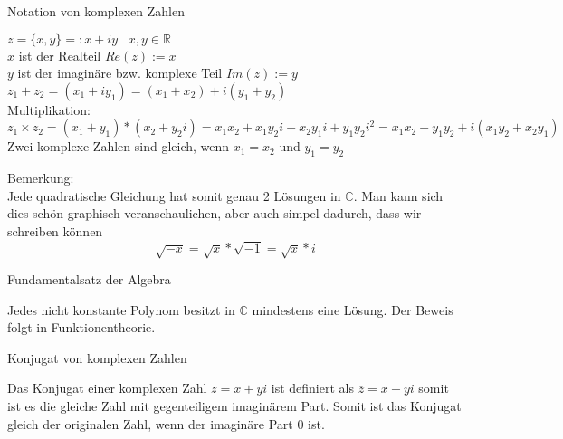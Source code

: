 \documentclass[smallheadings,headsepline,12pt,a4paper]{scrartcl}
\begin{document}
\newpage

\begin{center}
\item[Notation von komplexen Zahlen]
\end{center}
\item $z=\{x,y\} =: x+iy  \; \; \; x,y \in \mathbb{R} $ \\
$x$ ist der Realteil $Re(z):= x$ \\
$y$ ist der imaginäre bzw. komplexe Teil $Im(z):= y$ \\
$z_1+z_2 = (x_1+iy_1) = (x_1+x_2) + i(y_1+y_2) $ \\
Multiplikation:
$$ z_1\times z_2 = (x_1+y_1)*(x_2+y_2i) = x_1 x_2+x_1 y_2i+x_2 y_1i + y_1y_2 i^2 = x_1x_2 - y_1y_2 + i(x_1y_2+x_2y_1) $$
Zwei komplexe Zahlen sind gleich, wenn $x_1=x_2 $ und $y_1 = y_2 $ 

\item Bemerkung:\\
Jede quadratische Gleichung hat somit genau 2 Lösungen in $\mathbb{C}$. Man kann sich dies schön graphisch veranschaulichen, aber auch simpel dadurch, dass wir schreiben können $$ \sqrt{-x} = \sqrt{x} * \sqrt{-1} = \sqrt{x} * i $$

\begin{center}
\item[Fundamentalsatz der Algebra]
\end{center}
\item Jedes nicht konstante Polynom besitzt in $\mathbb{C}$ mindestens eine Lösung. Der Beweis folgt in Funktionentheorie.  \\

\begin{center}
\item[Konjugat von komplexen Zahlen]
\end{center}
\item Das Konjugat einer komplexen Zahl $z = x + yi$ ist definiert als $\overline{z} = x-yi$ somit ist es die gleiche Zahl mit gegenteiligem imaginärem Part. Somit ist das Konjugat gleich der originalen Zahl, wenn der imaginäre Part 0 ist.\\

\newpage
\end{document}
